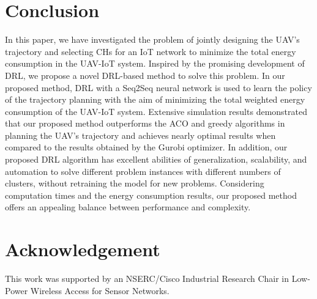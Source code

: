 \documentclass[journal]{IEEEtran}
\begin{document}
\section{Conclusion}\label{SecVII}

In this paper, we have investigated the problem of jointly designing the UAV's trajectory and selecting CHs for an IoT network to minimize the total energy consumption in the UAV-IoT system. Inspired by the promising development of DRL, we propose a novel DRL-based method to solve this problem. In our proposed method, DRL with a Seq2Seq neural network is used to learn the policy of the trajectory planning with the aim of minimizing the total weighted energy consumption of the UAV-IoT system. Extensive simulation results demonstrated that our proposed method outperforms {the ACO and} greedy algorithms in planning the UAV's trajectory and achieves nearly optimal results when compared to the results obtained by the Gurobi optimizer. In addition, {our proposed DRL algorithm has excellent abilities of generalization, scalability, and automation} to solve different problem instances with different numbers of clusters, without retraining the model for new problems. Considering computation times and the energy consumption results, our proposed method offers an appealing balance between performance and complexity.

\section*{Acknowledgement}

This work was supported by an NSERC/Cisco Industrial Research Chair in Low-Power Wireless Access for Sensor Networks.

\balance
\end{document}
